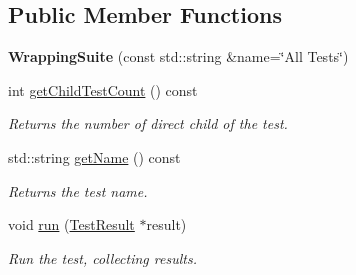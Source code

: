 \subsection*{Public Member Functions}
\begin{DoxyCompactItemize}
\item 
{\bfseries Wrapping\+Suite} (const std\+::string \&name=\char`\"{}All Tests\char`\"{})\hypertarget{class_test_runner_1_1_wrapping_suite_a3edce0cce0e3fdc996994d3dfe8f35fb}{}\label{class_test_runner_1_1_wrapping_suite_a3edce0cce0e3fdc996994d3dfe8f35fb}

\item 
int \hyperlink{class_test_runner_1_1_wrapping_suite_a5ef6d3d00fbc6493c06a2dc1f0e93077}{get\+Child\+Test\+Count} () const \hypertarget{class_test_runner_1_1_wrapping_suite_a5ef6d3d00fbc6493c06a2dc1f0e93077}{}\label{class_test_runner_1_1_wrapping_suite_a5ef6d3d00fbc6493c06a2dc1f0e93077}

\begin{DoxyCompactList}\small\item\em Returns the number of direct child of the test. \end{DoxyCompactList}\item 
std\+::string \hyperlink{class_test_runner_1_1_wrapping_suite_a500c7e2413a4830b87d8ab061251f856}{get\+Name} () const 
\begin{DoxyCompactList}\small\item\em Returns the test name. \end{DoxyCompactList}\item 
void \hyperlink{class_test_runner_1_1_wrapping_suite_aa486bfea64b60206ac1d8fbb006f2f64}{run} (\hyperlink{class_test_result}{Test\+Result} $\ast$result)\hypertarget{class_test_runner_1_1_wrapping_suite_aa486bfea64b60206ac1d8fbb006f2f64}{}\label{class_test_runner_1_1_wrapping_suite_aa486bfea64b60206ac1d8fbb006f2f64}

\begin{DoxyCompactList}\small\item\em Run the test, collecting results. \end{DoxyCompactList}\end{DoxyCompactItemize}
